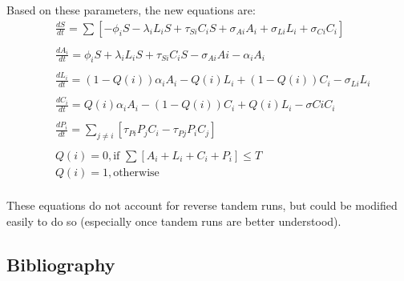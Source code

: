 \documentclass[letterpaper]{article}
\begin{document}
Based on these parameters, the new equations are:
\begin{equation}
\begin{aligned}
    & \frac{dS}{dt}   = \sum [{-\phi_iS - \lambda_iL_iS + \tau_{Si}C_iS + \sigma_{Ai}A_i + \sigma_{Li}L_i + \sigma_{Ci}C_i}] \\\\
  & \frac{dA_i}{dt} = \phi_iS + \lambda_iL_iS + \tau_{Si}C_iS - \sigma_{Ai}Ai - \alpha_iA_i \\\\
  & \frac{dL_i}{dt} = (1-Q(i))\alpha_iA_i - Q(i)L_i + (1 - Q(i))C_i - \sigma_{Li}L_i \\\\
  & \frac{dC_i}{dt} = Q(i)\alpha_iA_i - (1 - Q(i))C_i + Q(i)L_i - \sigma{Ci}C_i \\\\
  & \frac{dP_i}{dt} = \sum_{j \neq i} [\tau_{Pi}P_jC_i - \tau_{Pj}P_iC_j]\\\\
  & Q(i) = 0, \text{if    } \sum [A_i + L_i + C_i + P_i] \leq T \\
  & Q(i) = 1, \text{otherwise} \\
\end{aligned}
\end{equation}

These equations do not account for reverse tandem runs, but could be modified easily to do so (especially once tandem runs are better understood).

  \subsection{Bibliography}
      

\footnotesize


\end{document}
